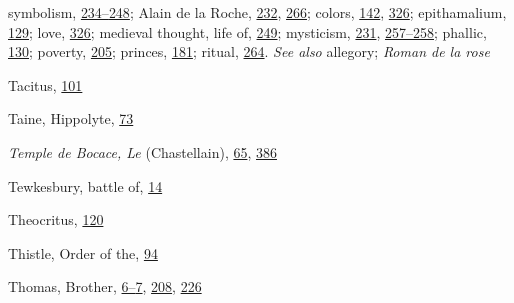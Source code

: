 symbolism,
\protect\hyperlink{16_Chapter_Nine__THE_DECLINE_OF_SYM.xhtmlux5cux23page_234}{234--}\protect\hyperlink{16_Chapter_Nine__THE_DECLINE_OF_SYM.xhtmlux5cux23page_248}{248};
Alain de la Roche,
\protect\hyperlink{15_Chapter_Eight__RELIGIOUS_EXCITAT.xhtmlux5cux23page_232}{232},
\protect\hyperlink{17_Chapter_Ten__THE_FAILURE_OF_IMAG.xhtmlux5cux23page_266}{266};
colors,
\protect\hyperlink{11_Chapter_Four__THE_FORMS_OF_LOVE.xhtmlux5cux23page_142}{142},
\protect\hyperlink{20_ILLUSTRATIONS_FOLLOW_PAGE.xhtmlux5cux23page_326}{326};
epithamalium,
\protect\hyperlink{11_Chapter_Four__THE_FORMS_OF_LOVE.xhtmlux5cux23page_129}{129};
love,
\protect\hyperlink{20_ILLUSTRATIONS_FOLLOW_PAGE.xhtmlux5cux23page_326}{326};
medieval thought, life of,
\protect\hyperlink{17_Chapter_Ten__THE_FAILURE_OF_IMAG.xhtmlux5cux23page_249}{249};
mysticism,
\protect\hyperlink{15_Chapter_Eight__RELIGIOUS_EXCITAT.xhtmlux5cux23page_231}{231},
\protect\hyperlink{17_Chapter_Ten__THE_FAILURE_OF_IMAG.xhtmlux5cux23page_257}{257--}\protect\hyperlink{17_Chapter_Ten__THE_FAILURE_OF_IMAG.xhtmlux5cux23page_258}{258};
phallic,
\protect\hyperlink{11_Chapter_Four__THE_FORMS_OF_LOVE.xhtmlux5cux23page_130}{130};
poverty,
\protect\hyperlink{14_Chapter_Seven__THE_PIOUS_PERSONA.xhtmlux5cux23page_205}{205};
princes,
\protect\hyperlink{13_Chapter_Six__THE_DEPICTION_OF_TH.xhtmlux5cux23page_181}{181};
ritual,
\protect\hyperlink{17_Chapter_Ten__THE_FAILURE_OF_IMAG.xhtmlux5cux23page_264}{264}.
\emph{See also} allegory; \emph{Roman de la rose}

Tacitus,
\protect\hyperlink{10_Chapter_Three__THE_HEROIC_DREAM.xhtmlux5cux23page_101}{101}

Taine, Hippolyte,
\protect\hyperlink{10_Chapter_Three__THE_HEROIC_DREAM.xhtmlux5cux23page_73}{73}

\emph{Temple de Bocace, Le} (Chastellain),
\protect\hyperlink{10_Chapter_Three__THE_HEROIC_DREAM.xhtmlux5cux23page_65}{65},
\protect\hyperlink{22_Chapter_Fourteen__THE_COMING_OF.xhtmlux5cux23page_386}{386}

Tewkesbury, battle of,
\protect\hyperlink{08_Chapter_One__THE_PASSIONATE_INTE.xhtmlux5cux23page_14}{14}

Theocritus,
\protect\hyperlink{10_Chapter_Three__THE_HEROIC_DREAM.xhtmlux5cux23page_120}{120}

Thistle, Order of the,
\protect\hyperlink{10_Chapter_Three__THE_HEROIC_DREAM.xhtmlux5cux23page_94}{94}

Thomas, Brother,
\protect\hyperlink{08_Chapter_One__THE_PASSIONATE_INTE.xhtmlux5cux23page_6}{6--}\protect\hyperlink{08_Chapter_One__THE_PASSIONATE_INTE.xhtmlux5cux23page_7}{7},
\protect\hyperlink{14_Chapter_Seven__THE_PIOUS_PERSONA.xhtmlux5cux23page_208}{208},
\protect\hyperlink{15_Chapter_Eight__RELIGIOUS_EXCITAT.xhtmlux5cux23page_226}{226}

